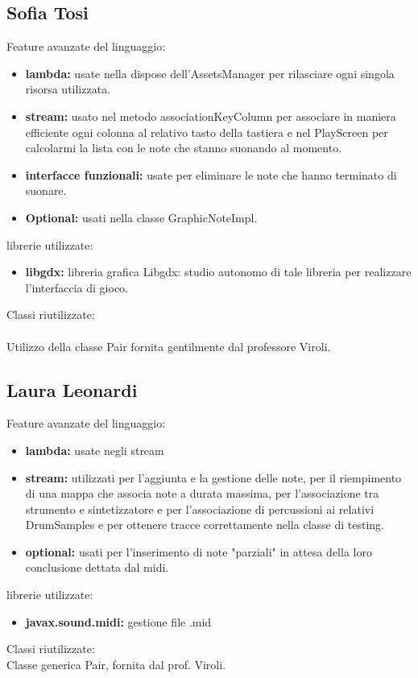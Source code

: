 \documentclass[a4paper,12pt]{report}
\begin{document}
\subsection{Sofia Tosi}
Feature avanzate del linguaggio:
\begin{itemize}
	\item \textbf{lambda:} usate nella dispose dell'AssetsManager per rilasciare ogni singola risorsa utilizzata.
	\item \textbf{stream:} usato nel metodo associationKeyColumn per associare in maniera efficiente ogni colonna al relativo tasto della tastiera e nel PlayScreen per calcolarmi la lista con le note che stanno suonando al momento.
	\item \textbf{interfacce funzionali:} usate per eliminare le note che hanno terminato di suonare.
	\item \textbf{Optional:} usati nella classe GraphicNoteImpl.
\end{itemize}
librerie utilizzate:
\begin{itemize}
	\item \textbf{libgdx:} libreria grafica Libgdx: studio autonomo di tale libreria per realizzare l'interfaccia di gioco.
\end{itemize}
Classi riutilizzate: \\ \\
Utilizzo della classe Pair fornita gentilmente dal professore Viroli.
\newpage

\subsection{Laura Leonardi}
Feature avanzate del linguaggio:
\begin{itemize}
	\item \textbf{lambda:} usate negli stream
	\item \textbf{stream:} utilizzati per l'aggiunta e la gestione delle note, per il riempimento di una mappa che associa note a durata massima, per l'associazione tra strumento e sintetizzatore e per l'associazione di percussioni ai relativi DrumSamples e per ottenere tracce correttamente nella classe di testing.
	\item \textbf{optional:} usati per l'inserimento di note "parziali" in attesa della loro conclusione dettata dal midi.
\end{itemize}
librerie utilizzate:
\begin{itemize}
	\item \textbf{javax.sound.midi:} gestione file .mid
\end{itemize}
Classi riutilizzate: \\
Classe generica Pair, fornita dal prof. Viroli.
\newpage
\end{document}
